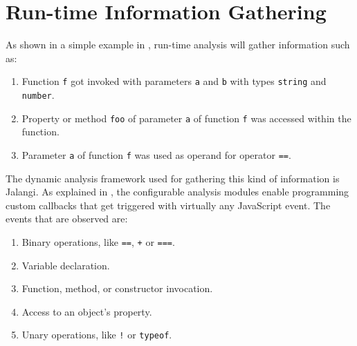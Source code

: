 
\section{Run-time Information Gathering} \label{run-time-information-gathering}
As shown in a simple example in , run-time analysis will gather information such as:

\begin{enumerate}
  \item Function \texttt{f} got invoked with parameters \texttt{a} and \texttt{b} with types \texttt{string} and \texttt{number}.
  \item Property or method \texttt{foo} of parameter \texttt{a} of function \texttt{f} was accessed within the function.
  \item Parameter \texttt{a} of function \texttt{f} was used as operand for operator \texttt{==}.
\end{enumerate}

The dynamic analysis framework used for gathering this kind of information is Jalangi. As explained in , the configurable analysis modules enable programming custom callbacks that get triggered with virtually any JavaScript event. The events that are observed are:
\begin{enumerate}
  \item Binary operations, like \texttt{==}, \texttt{+} or \texttt{===}.
  \item Variable declaration.
  \item Function, method, or constructor invocation.
  \item Access to an object's property.
  \item Unary operations, like \texttt{!} or \texttt{typeof}.
\end{enumerate}


